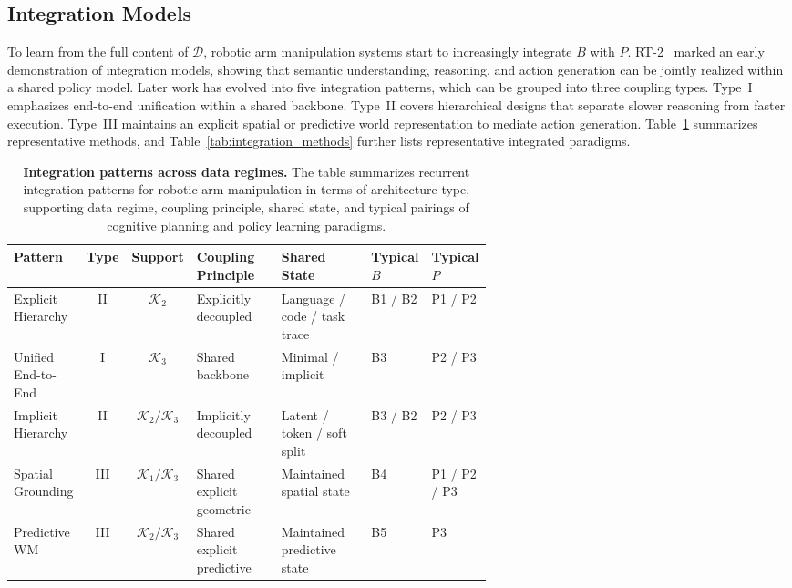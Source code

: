 \documentclass[acmsmall,screen,review]{acmart}
\begin{document}
\subsection{Integration Models}\label{sec:integration_models}

To learn from the full content of \(\mathcal{D}\), robotic arm manipulation systems start to increasingly integrate \(B\) with \(P\).
RT-2~\cite{brohan2023rt2} marked an early demonstration of integration models, showing that semantic understanding, reasoning, and action generation can be jointly realized within a shared policy model.
Later work has evolved into five integration patterns, which can be grouped into three coupling types.
Type~I emphasizes end-to-end unification within a shared backbone.
Type~II covers hierarchical designs that separate slower reasoning from faster execution.
Type~III maintains an explicit spatial or predictive world representation to mediate action generation.
Table~\ref{tab:data_learning_map} summarizes representative methods, and Table~\ref{tab:integration_methods} further lists representative integrated paradigms.

\begin{table}[!t]
\centering
\caption{\textbf{Integration patterns across data regimes.} The table summarizes recurrent integration patterns for robotic arm manipulation in terms of architecture type, supporting data regime, coupling principle, shared state, and typical pairings of cognitive planning and policy learning paradigms. }\label{tab:data_learning_map}
\renewcommand{\arraystretch}{1.3}
\setlength{\tabcolsep}{2pt}
\scriptsize
\begin{tabular}{
  l
  c
  c
  p{0.20\linewidth}
  p{0.21\linewidth}
  p{0.10\linewidth}
  p{0.10\linewidth}
}
\toprule
\textbf{Pattern} &
\textbf{Type} &
\textbf{Support} &
\textbf{Coupling Principle} &
\textbf{Shared State} &
\textbf{Typical \(B\)} &
\textbf{Typical \(P\)} \\
\midrule
Explicit Hierarchy &
II &
$\mathcal{K}_2$ &
Explicitly decoupled &
Language / code / task trace &
B1 / B2 &
P1 / P2 \\
\midrule
Unified End-to-End &
I &
$\mathcal{K}_3$ &
Shared backbone &
Minimal / implicit &
B3 &
P2 / P3 \\
\midrule
Implicit Hierarchy &
II &
$\mathcal{K}_2 / \mathcal{K}_3$ &
Implicitly decoupled &
Latent / token / soft split &
B3 / B2 &
P2 / P3 \\
\midrule
Spatial Grounding &
III &
$\mathcal{K}_1 / \mathcal{K}_3$ &
Shared explicit geometric &
Maintained spatial state &
B4 &
P1 / P2 / P3 \\
\midrule
Predictive WM &
III &
$\mathcal{K}_2 / \mathcal{K}_3$ &
Shared explicit predictive &
Maintained predictive state &
B5 &
P3 \\
\bottomrule
\end{tabular}
\end{table}
\end{document}
